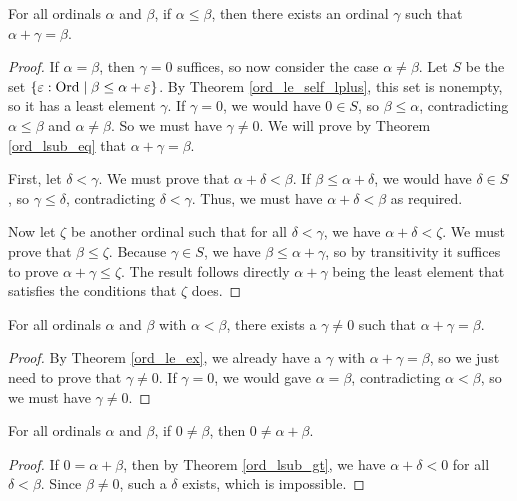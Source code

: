 \documentclass[../../math.tex]{subfiles}
\begin{document}
\begin{theorem} \label{ord_le_ex}
    For all ordinals $\alpha$ and $\beta$, if $\alpha \leq \beta$, then there
    exists an ordinal $\gamma$ such that $\alpha + \gamma = \beta$.
\end{theorem}
\begin{proof}
    If $\alpha = \beta$, then $\gamma = 0$ suffices, so now consider the case
    $\alpha \neq \beta$.  Let $S$ be the set $\{\varepsilon : \operatorname{Ord} \mid \beta
    \leq \alpha + \varepsilon\}$.  By Theorem \ref{ord_le_self_lplus}, this set
    is nonempty, so it has a least element $\gamma$.  If $\gamma = 0$, we would
    have $0 \in S$, so $\beta \leq \alpha$, contradicting $\alpha \leq \beta$
    and $\alpha \neq \beta$.  So we must have $\gamma \neq 0$.  We will prove by
    Theorem \ref{ord_lsub_eq} that $\alpha + \gamma = \beta$.

    First, let $\delta < \gamma$.  We must prove that $\alpha + \delta < \beta$.
    If $\beta \leq \alpha + \delta$, we would have $\delta \in S$, so $\gamma
    \leq \delta$, contradicting $\delta < \gamma$.  Thus, we must have $\alpha +
    \delta < \beta$ as required.

    Now let $\zeta$ be another ordinal such that for all $\delta < \gamma$, we
    have $\alpha + \delta < \zeta$.  We must prove that $\beta \leq \zeta$.
    Because $\gamma \in S$, we have $\beta \leq \alpha + \gamma$, so by
    transitivity it suffices to prove $\alpha + \gamma \leq \zeta$.  The result
    follows directly $\alpha + \gamma$ being the least element that satisfies
    the conditions that $\zeta$ does.
\end{proof}

\begin{theorem} \label{ord_lt_ex}
    For all ordinals $\alpha$ and $\beta$ with $\alpha < \beta$, there exists a
    $\gamma \neq 0$ such that $\alpha + \gamma = \beta$.
\end{theorem}
\begin{proof}
    By Theorem \ref{ord_le_ex}, we already have a $\gamma$ with $\alpha + \gamma
    = \beta$, so we just need to prove that $\gamma \neq 0$.  If $\gamma = 0$,
    we would gave $\alpha = \beta$, contradicting $\alpha < \beta$, so we must
    have $\gamma \neq 0$.
\end{proof}

\begin{theorem} \label{ord_nz_rplus}
    For all ordinals $\alpha$ and $\beta$, if $0 \neq \beta$, then $0 \neq
    \alpha + \beta$.
\end{theorem}
\begin{proof}
    If $0 = \alpha + \beta$, then by Theorem \ref{ord_lsub_gt}, we have $\alpha
    + \delta < 0$ for all $\delta < \beta$.  Since $\beta \neq 0$, such a
    $\delta$ exists, which is impossible.
\end{proof}
\end{document}
